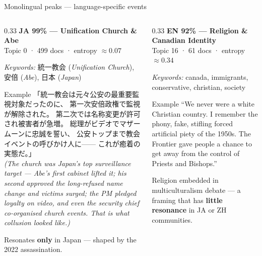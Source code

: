 \documentclass[aspectratio=169,10pt]{beamer}
\newcommand{\emphc}[1]{\textcolor{uzhaccent}{\textbf{#1}}}
\newcommand{\keyword}[1]{\textcolor{uzhblue}{\textbf{#1}}}
\begin{document}
\begin{frame}{Monolingual peaks — language-specific events}
  \footnotesize
  \begin{columns}[T]

    \begin{column}{0.33\textwidth}
      \textbf{\keyword{JA 99\%} — Unification Church \& Abe}\\
      \textcolor{mutedgray}{\scriptsize Topic 0 · 499 docs · entropy $\approx 0.07$}
      \vspace{0.4em}

      \textit{Keywords:} 統一教会 (\textit{Unification Church}),
        安倍 (\textit{Abe}), 
        日本 (\textit{Japan})
      \vspace{0.5em}

      \begin{block}{Example}
      \scriptsize
      「統一教会は元々公安の最重要監視対象だったのに、
      第一次安倍政権で監視が解除された。
      第二次では名称変更が許可され被害者が急増。
      総理がビデオでマザームーンに忠誠を誓い、
      公安トップまで教会イベントの呼びかけ人に——
      これが癒着の実態だ。」\\[0.3em]
      \textcolor{mutedgray}{\textit{(The church was Japan's top surveillance target — Abe's first cabinet lifted it; his second approved the long-refused name change and victims surged; the PM pledged loyalty on video, and even the security chief co-organised church events. That is what collusion looked like.)}}
      \end{block}
      \vspace{0.3em}
      \scriptsize Resonates \emphc{only} in Japan — shaped by the 2022 assassination.
    \end{column}

    \begin{column}{0.33\textwidth}
      \textbf{\keyword{EN 92\%} — Religion \& Canadian Identity}\\
      \textcolor{mutedgray}{\scriptsize Topic 16 · 61 docs · entropy $\approx 0.34$}
      \vspace{0.4em}

      \textit{Keywords:} canada, immigrants, conservative, christian, society
      \vspace{0.5em}

      \begin{block}{Example}
      \scriptsize
      ``We never were a white Christian country. I remember
      the phony, fake, stifling forced artificial piety of
      the 1950s. The Frontier gave people a chance to get
      away from the control of Priests and Bishops.''
      \end{block}
      \vspace{0.3em}
      \scriptsize Religion embedded in multiculturalism debate — a framing that has \emphc{little resonance} in JA or ZH communities.
    \end{column}


\end{columns}
\end{frame}
\end{document}
